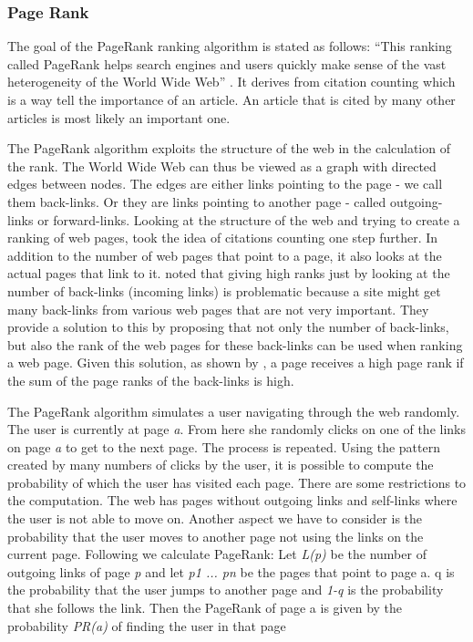 \subsubsection{Page Rank}
The goal of the PageRank ranking algorithm is stated as follows: “This ranking called PageRank helps search engines and users quickly make sense of the vast heterogeneity of the World Wide Web” \citep[p. 1]{Page1999}. It derives from citation counting which is a way tell the importance of an article. An article that is cited by many other articles is most likely an important one. 

The PageRank algorithm exploits the structure of the web in the calculation of the rank. The World Wide Web can thus be viewed as a graph with directed edges between nodes. The edges are either links pointing to the page - we call them back-links. Or they are links pointing to another page - called outgoing-links or forward-links. Looking at the structure of the web and trying to create a ranking of web pages, \citet{Page1999} took the idea of citations counting one step further. In addition to the number of web pages that point to a page, it also looks at the actual pages that link to it. \citet{Page1999} noted that giving high ranks just by looking at the number of back-links (incoming links) is problematic because a site might get many back-links from various web pages that are not very important. They provide a solution to this by proposing that not only the number of back-links, but also the rank of the web pages for these back-links can be used when ranking a web page. Given this solution, as shown by \citet{Page1999}, a page receives a high page rank if the sum of the page ranks of the back-links is high.

The PageRank algorithm simulates a user navigating through the web randomly. The user is currently at page \emph{a}. From here she randomly clicks on one of the links on page \emph{a} to get to the next page. The process is repeated. Using the pattern created by many numbers of clicks by the user, it is possible to compute the probability of which the user has visited each page. There are some restrictions to the computation. The web has pages without outgoing links and self-links where the user is not able to move on. Another aspect we have to consider is the probability that the user moves to another page not using the links on the current page. Following we calculate PageRank:
Let \emph{L(p)} be the number of outgoing links of page \emph{p} and let \emph{p1 ... pn} be the pages that point to page a. q is the probability that the user jumps to another page and \emph{1-q} is the probability that she follows the link.  Then the PageRank of page a is given by the probability \emph{PR(a)} of finding the user in that page


